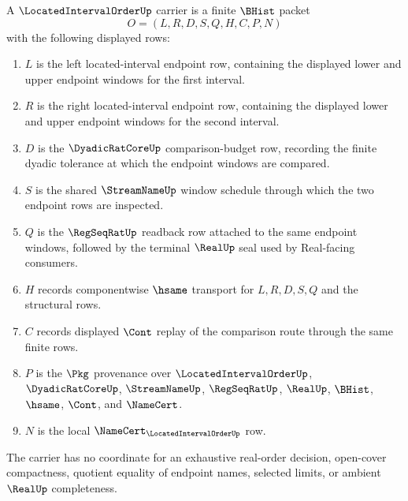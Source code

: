 \begin{definition}
\label{def:located-interval-order-carrier}
A $\LocatedIntervalOrderUp$ carrier is a finite $\BHist$ packet
$$
O=(L,R,D,S,Q,H,C,P,N)
$$
with the following displayed rows:
\begin{enumerate}
\item $L$ is the left located-interval endpoint row, containing the displayed lower and upper endpoint windows for the first interval.
\item $R$ is the right located-interval endpoint row, containing the displayed lower and upper endpoint windows for the second interval.
\item $D$ is the $\DyadicRatCoreUp$ comparison-budget row, recording the finite dyadic tolerance at which the endpoint windows are compared.
\item $S$ is the shared $\StreamNameUp$ window schedule through which the two endpoint rows are inspected.
\item $Q$ is the $\RegSeqRatUp$ readback row attached to the same endpoint windows, followed by the terminal $\RealUp$ seal used by Real-facing consumers.
\item $H$ records componentwise $\hsame$ transport for $L,R,D,S,Q$ and the structural rows.
\item $C$ records displayed $\Cont$ replay of the comparison route through the same finite rows.
\item $P$ is the $\Pkg$ provenance over $\LocatedIntervalOrderUp$, $\DyadicRatCoreUp$, $\StreamNameUp$, $\RegSeqRatUp$, $\RealUp$, $\BHist$, $\hsame$, $\Cont$, and $\NameCert$.
\item $N$ is the local $\NameCert_{\LocatedIntervalOrderUp}$ row.
\end{enumerate}
The carrier has no coordinate for an exhaustive real-order decision, open-cover compactness, quotient equality of endpoint names, selected limits, or ambient $\RealUp$ completeness.
\end{definition}

